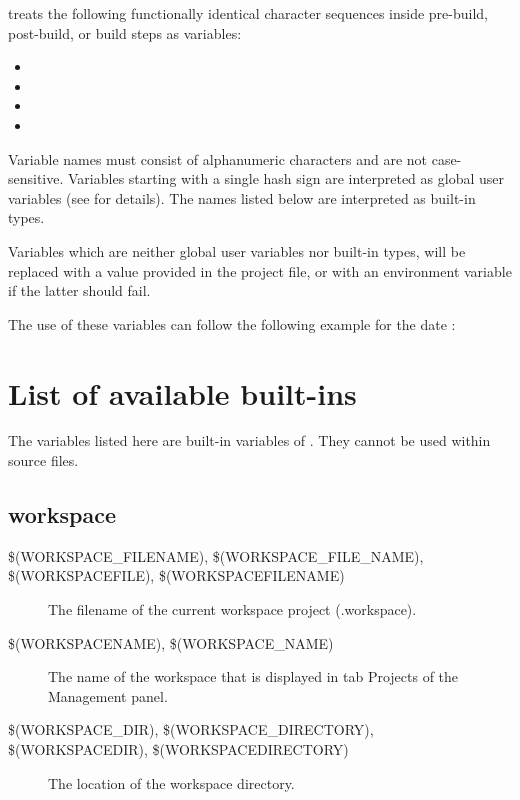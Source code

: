 \codeblocks treats the following functionally identical character sequences inside pre-build, post-build, or build steps as variables:

\begin{itemize}
\item {}
\item {}
\item {}
\item {}
\end{itemize}

Variable names must consist of alphanumeric characters and are not case-sensitive. Variables starting with a single hash sign \codeline{(#)} are interpreted as global user variables (see  for details). The names listed below are interpreted as built-in types.

Variables which are neither global user variables nor built-in types, will be replaced with a value provided in the project file, or with an environment variable if the latter should fail.

The use of these variables can follow the following example for the date :

 \newline
{}


\section{List of available built-ins}\label{sec:builtin_variables}

The variables listed here are built-in variables of \codeblocks. They cannot be used within source files.

\subsection{\codeblocks workspace}

\begin{description}
\item[{\scriptsize \$(WORKSPACE\_FILENAME), \$(WORKSPACE\_FILE\_NAME), \$(WORKSPACEFILE), \$(WORKSPACEFILENAME)}] The filename of the current workspace project (.workspace).
\item[{\scriptsize \$(WORKSPACENAME), \$(WORKSPACE\_NAME)}] The name of the workspace that is displayed in tab Projects of the Management panel.
\item[{\scriptsize \$(WORKSPACE\_DIR), \$(WORKSPACE\_DIRECTORY), \$(WORKSPACEDIR), \$(WORKSPACEDIRECTORY)}] The location of the workspace directory.
\end{description}

